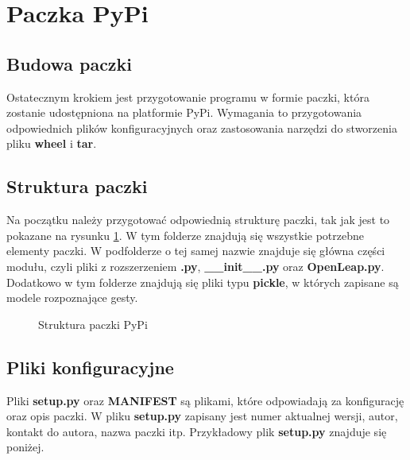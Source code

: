 \section{Paczka PyPi}

\subsection{Budowa paczki}

\quad Ostatecznym krokiem jest przygotowanie programu w formie paczki, która zostanie udostępniona na platformie PyPi. Wymagania to przygotowania odpowiednich plików konfiguracyjnych oraz zastosowania narzędzi do stworzenia pliku \textbf{wheel} i \textbf{tar}. 

\subsection{Struktura paczki}
\quad Na początku należy przygotować odpowiednią strukturę paczki, tak jak jest to pokazane na rysunku \ref{tree:pypi_package}. W tym folderze znajdują się wszystkie potrzebne elementy paczki. W podfolderze o tej samej nazwie znajduje się główna części modułu, czyli pliki z rozszerzeniem \textbf{.py}, \textbf{\_\_init\_\_.py} oraz \textbf{OpenLeap.py}. Dodatkowo w tym folderze znajdują się pliki typu \textbf{pickle}, w których zapisane są modele rozpoznające gesty.

\begin{figure}[H]
\centering
    \begin{minipage}{7cm}
    \end{minipage}
    \caption{Struktura paczki PyPi}
    \label{tree:pypi_package}
\end{figure}

\subsection{Pliki konfiguracyjne}
\quad Pliki \textbf{setup.py} oraz \textbf{MANIFEST} są plikami, które odpowiadają za konfigurację oraz opis paczki. W pliku \textbf{setup.py} zapisany jest numer aktualnej wersji, autor, kontakt do autora, nazwa paczki itp. Przykładowy plik \textbf{setup.py} znajduje się poniżej. \newline

